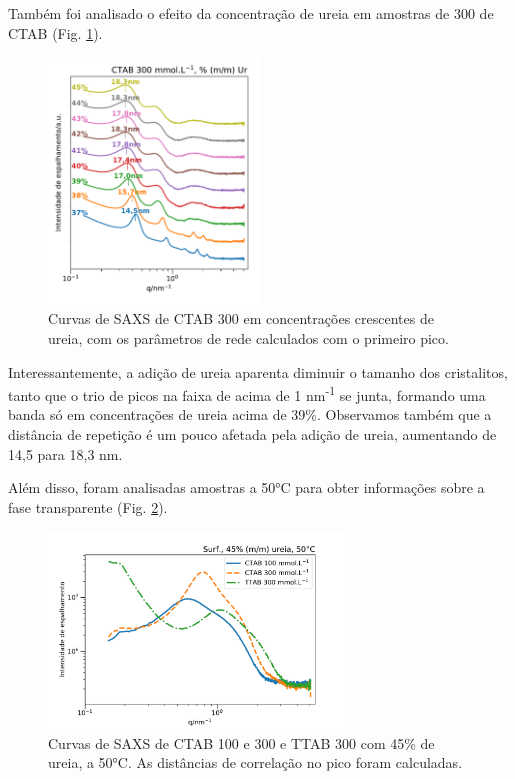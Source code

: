 	
	Também foi analisado o efeito da concentração de ureia em amostras de 300 \mM{} de CTAB (Fig. \ref{fig:SAXS_ctab300ur37-45}).
	
	\begin{figure}[H]
		\centering
		\includegraphics[width=0.5\textwidth]{imagens/saxs/CTAB300Ur37-45}
		\caption{Curvas de SAXS de CTAB 300 \mM{} em concentrações crescentes de ureia, com os parâmetros de rede calculados com o primeiro pico.}
		\label{fig:SAXS_ctab300ur37-45}
	\end{figure}
	
	Interessantemente, a adição de ureia aparenta diminuir o tamanho dos cristalitos, tanto que o trio de picos na faixa de \q{} acima de 1 nm\textsuperscript{-1} se junta, formando uma banda só em concentrações de ureia acima de 39\%. Observamos também que a distância de repetição é um pouco afetada pela adição de ureia, aumentando de 14,5 para 18,3 nm.
	
	Além disso, foram analisadas amostras a 50°C para obter informações sobre a fase transparente (Fig. \ref{fig:SAXS_surf50c}).
	
	\begin{figure}[H]
		\centering
		\includegraphics[width=0.7\textwidth]{imagens/saxs/Surf_50C}
		\caption{Curvas de SAXS de CTAB 100 e 300 \mM{} e TTAB 300 \mM{} com 45\% de ureia, a 50°C. As distâncias de correlação no pico foram calculadas.}
		\label{fig:SAXS_surf50c}
	\end{figure}

